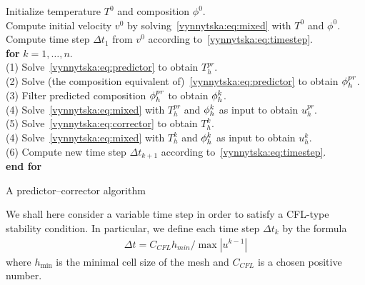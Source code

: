\begin{algorithm}
  \begin{tabbing}
    Initialize temperature $T^0$ and composition $\phi^0$. \\
    Compute initial velocity $v^0$ by
    solving~\eqref{vynnytska:eq:mixed} with $T^0$ and $\phi^0$. \\
    Compute time step $\Delta t_1$ from $v^0$ according
    to~\eqref{vynnytska:eq:timestep}. \\
    \textbf{for}  {$k = 1, \dots, n$}. \\
    \tab (1) Solve~\eqref{vynnytska:eq:predictor} to obtain $T_h^{pr}$. \\
    \tab (2) Solve (the composition equivalent
    of)~\eqref{vynnytska:eq:predictor} to obtain $\phi_h^{pr}$. \\
    \tab (3) Filter predicted composition $\phi_h^{pr}$ to
    obtain $\phi_h^{k}$. \\
    \tab (4) Solve~\eqref{vynnytska:eq:mixed} with $T_h^{pr}$ and
    $\phi_h^{k}$ as input to obtain $u_h^{pr}$. \\
    \tab (5) Solve~\eqref{vynnytska:eq:corrector} to obtain $T_h^{k}$. \\
    \tab (4) Solve~\eqref{vynnytska:eq:mixed} with $T_h^{k}$ and
    $\phi_h^{k}$ as input to obtain $u_h^{k}$. \\
    \tab (6) Compute new time step $\Delta t_{k+1}$ according
    to~\eqref{vynnytska:eq:timestep}. \\
    \textbf{end for}
  \end{tabbing}
  \caption{A predictor--corrector algorithm}
  \label{vynnytska:alg:algorithm}
\end{algorithm}

We shall here consider a variable time step in order to satisfy a
CFL-type stability condition. In particular, we define each time step
$\Delta t_k$ by the formula
\begin{align}
   \label{vynnytska:eq:timestep}
   \Delta t =  C_{CFL} h_{min} / \max{|u^{k-1}|}
\end{align}
where $h_{\min}$ is the minimal cell size of the mesh and $C_{CFL}$ is
a chosen positive number.

